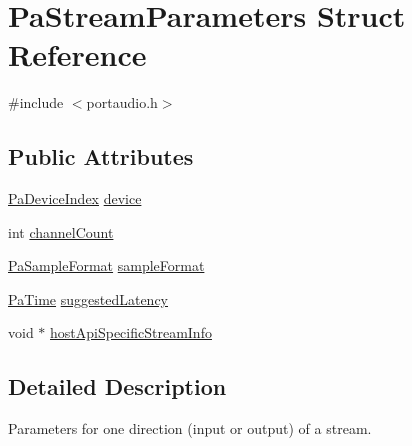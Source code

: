 \hypertarget{struct_pa_stream_parameters}{\section{Pa\+Stream\+Parameters Struct Reference}
\label{struct_pa_stream_parameters}
}


{\ttfamily \#include $<$portaudio.\+h$>$}

\subsection*{Public Attributes}
\begin{DoxyCompactItemize}
\item 
\hyperlink{portaudio_8h_ad79317e65bde63d76c4b8e711ac5a361}{Pa\+Device\+Index} \hyperlink{struct_pa_stream_parameters_aebaf648b4d11dd1252a747b76b8da084}{device}
\item 
int \hyperlink{struct_pa_stream_parameters_a861ff361da71fc2572dd356c9c9878ca}{channel\+Count}
\item 
\hyperlink{portaudio_8h_a4582d93c2c2e60e12be3d74c5fe00b96}{Pa\+Sample\+Format} \hyperlink{struct_pa_stream_parameters_ad8d2d3063757b812f9e5f8709f41052b}{sample\+Format}
\item 
\hyperlink{portaudio_8h_af17a7e6d0471a23071acf8dbd7bbe4bd}{Pa\+Time} \hyperlink{struct_pa_stream_parameters_aa1e80ac0551162fd091db8936ccbe9a0}{suggested\+Latency}
\item 
void $\ast$ \hyperlink{struct_pa_stream_parameters_aff01b9fa0710ad1654471e97665c06a9}{host\+Api\+Specific\+Stream\+Info}
\end{DoxyCompactItemize}


\subsection{Detailed Description}
Parameters for one direction (input or output) of a stream. 


